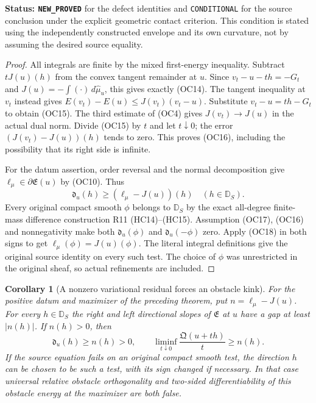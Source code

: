 \documentclass[11pt,a4paper]{article}
\numberwithin{equation}{section}
\newtheorem{corollary}[theorem]{Corollary}
\theoremstyle{definition}
\theoremstyle{remark}
\begin{document}
\noindent\textbf{Status: \texttt{NEW\_PROVED}} for the
defect identities and \texttt{CONDITIONAL} for the source
conclusion under the explicit geometric contact criterion.
This condition is stated using the independently constructed
envelope and its own curvature, not by assuming the desired
source equality.

\begin{proof}
All integrals are finite by the mixed first-energy inequality.
Subtract $tJ(u)(h)$ from the convex tangent remainder at $u$.
Since $v_t-u-th=-G_t$ and $J(u)=-\int(\cdot)\,d\widehat\mu_u$,
this gives exactly \textup{(OC14)}.  The tangent inequality
at $v_t$ instead gives
$E(v_t)-E(u)\le J(v_t)(v_t-u)$.
Substitute $v_t-u=th-G_t$ to obtain \textup{(OC15)}.
The third estimate of \textup{(OC4)} gives
$J(v_t)\to J(u)$ in the actual dual norm.  Divide
\textup{(OC15)} by $t$ and let $t\downarrow0$; the error
$(J(v_t)-J(u))(h)$ tends to zero.  This proves
\textup{(OC16)}, including the possibility that its right
side is infinite.

For the datum assertion, order reversal and the normal
decomposition give $\ell_\mu\in\partial\mathfrak E(u)$
by \textup{(OC10)}.  Thus
\[
 \mathfrak d_u(h)\ge(\ell_\mu-J(u))(h)
                                    \quad(h\in\mathbb D_S).
 \tag{OC18}
\]
Every original compact smooth $\phi$ belongs to $\mathbb D_S$
by the exact all-degree finite-mass difference construction
R11 \textup{(HC14)--(HC15)}.  Assumption \textup{(OC17)},
\textup{(OC16)} and nonnegativity make both
$\mathfrak d_u(\phi)$ and $\mathfrak d_u(-\phi)$ zero.
Apply \textup{(OC18)} in both signs to get
$\ell_\mu(\phi)=J(u)(\phi)$.  The literal integral
definitions give the original source identity on every
such test.  The choice of $\phi$ was unrestricted in the
original sheaf, so actual refinements are included.
\end{proof}

\begin{corollary}[A nonzero variational residual forces an obstacle kink]
\label{cor:r12-normal-residual-obstacle-kink}
For the positive datum and maximizer of the preceding theorem,
put $n=\ell_\mu-J(u)$.  For every $h\in\mathbb D_S$ the
right and left directional slopes of $\mathfrak E$ at $u$
have a gap at least $|n(h)|$.  If $n(h)>0$, then
\[
 \mathfrak d_u(h)\ge n(h)>0,
 \qquad
 \liminf_{t\downarrow0}\frac{\mathfrak Q(u+th)}{t}\ge n(h).
 \tag{OC19}
\]
If the source equation fails on an original compact smooth
test, the direction $h$ can be chosen to be such a test,
with its sign changed if necessary.  In that case universal
relative obstacle orthogonality and two-sided differentiability
of this obstacle energy at the maximizer are both false.
\end{corollary}
\end{document}

